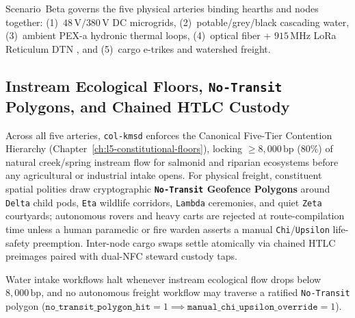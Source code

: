 Scenario~Beta governs the five physical arteries binding hearths and nodes together: (1)~$48\,\mathrm{V}/380\,\mathrm{V}$
DC microgrids, (2)~potable/grey/black cascading water, (3)~ambient PEX-a hydronic thermal loops,
(4)~optical fiber + $915\,\mathrm{MHz}$ LoRa Reticulum DTN \parencite{fall2003}, and (5)~cargo
e-trikes and watershed freight.

\subsection{Instream Ecological Floors, \texttt{No-Transit} Polygons, and Chained HTLC Custody}

Across all five arteries, \texttt{col-kmsd} enforces the Canonical Five-Tier Contention Hierarchy
(Chapter~\ref{ch:l5-constitutional-floors}), locking $\ge 8{,}000\,\mathrm{bp}$ ($80\%$) of natural
creek/spring instream flow for salmonid and riparian ecosystems before any agricultural or industrial
intake opens. For physical freight, constituent spatial polities draw cryptographic
\textbf{\texttt{No-Transit} Geofence Polygons} around \texttt{Delta} child pods, \texttt{Eta}
wildlife corridors, \texttt{Lambda} ceremonies, and quiet \texttt{Zeta} courtyards; autonomous
rovers and heavy carts are rejected at route-compilation time unless a human paramedic or fire
warden asserts a manual \texttt{Chi}/\texttt{Upsilon} life-safety preemption. Inter-node cargo swaps
settle atomically via chained HTLC preimages paired with dual-NFC steward custody taps.

\begin{invariant}
\label{inv:waveb-beta-notransit}
Water intake workflows halt whenever instream ecological flow drops below $8{,}000\,\mathrm{bp}$,
and no autonomous freight workflow may traverse a ratified \texttt{No-Transit} polygon
($\mathtt{no\_transit\_polygon\_hit} = 1 \implies \mathtt{manual\_chi\_upsilon\_override} = 1$).
\end{invariant}

